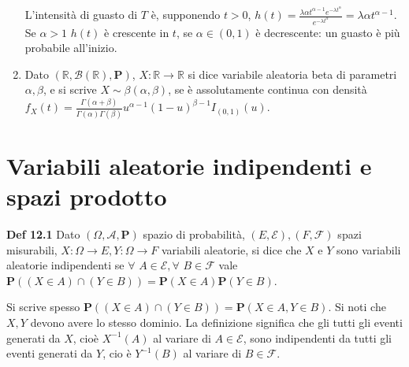 \documentclass{article}
\begin{document}
\begin{enumerate}
L'intensit\`{a} di guasto di $T$ \`{e}, supponendo $t>0$, $h\left( t\right) =%
\frac{\lambda \alpha t^{\alpha -1}e^{-\lambda t^{\alpha }}}{e^{-\lambda
t^{\alpha }}}=\lambda \alpha t^{\alpha -1}$. Se $\alpha >1$ $h\left(
t\right) $ \`{e} crescente in $t$, se $\alpha \in \left( 0,1\right) $ \`{e}
decrescente: un guasto \`{e} pi\`{u} probabile all'inizio.

\item Dato $\left( 
\mathbb{R}
,\mathcal{B}\left( 
\mathbb{R}
\right) ,\mathbf{P}\right) $, $X:%
\mathbb{R}
\rightarrow 
\mathbb{R}
$ si dice variabile aleatoria beta di parametri $\alpha ,\beta $, e si
scrive $X\sim \beta \left( \alpha ,\beta \right) $, se \`{e} assolutamente
continua con densit\`{a} $f_{X}\left( t\right) =\frac{\Gamma \left( \alpha
+\beta \right) }{\Gamma \left( \alpha \right) \Gamma \left( \beta \right) }%
u^{\alpha -1}\left( 1-u\right) ^{\beta -1}I_{\left( 0,1\right) }\left(
u\right) $.
\end{enumerate}

\section{Variabili aleatorie indipendenti e spazi prodotto}

\textbf{Def 12.1} Dato $\left( \Omega ,\mathcal{A},\mathbf{P}\right) $
spazio di probabilit\`{a}, $\left( E,\mathcal{E}\right) ,\left( F,\mathcal{F}%
\right) $ spazi misurabili, $X:\Omega \rightarrow E,Y:\Omega \rightarrow F$
variabili aleatorie, si dice che $X$ e $Y$ sono variabili aleatorie
indipendenti se $\forall $ $A\in \mathcal{E},\forall $ $B\in \mathcal{F}$
vale $\mathbf{P}\left( \left( X\in A\right) \cap \left( Y\in B\right)
\right) =\mathbf{P}\left( X\in A\right) \mathbf{P}\left( Y\in B\right) $.

Si scrive spesso $\mathbf{P}\left( \left( X\in A\right) \cap \left( Y\in
B\right) \right) =\mathbf{P}\left( X\in A,Y\in B\right) $. Si noti che $X,Y$
devono avere lo stesso dominio. La definizione significa che gli tutti gli
eventi generati da $X$, cio\`{e} $X^{-1}\left( A\right) $ al variare di $%
A\in \mathcal{E}$, sono indipendenti da tutti gli eventi generati da $Y$, cio%
\`{e} $Y^{-1}\left( B\right) $ al variare di $B\in \mathcal{F}$.
\end{document}
